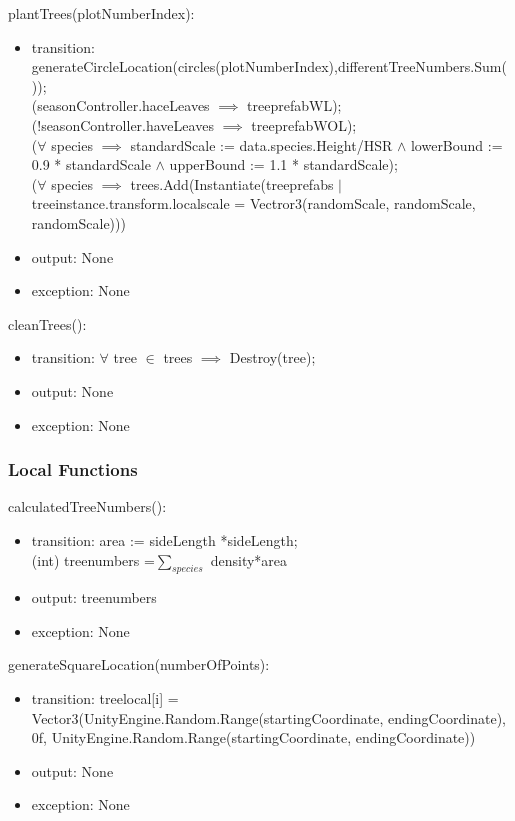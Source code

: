 \documentclass[12pt, titlepage]{article}
\begin{document}
\noindent plantTrees(plotNumberIndex):
\begin{itemize}
\item transition: generateCircleLocation(circles(plotNumberIndex),differentTreeNumbers.Sum());\\
(seasonController.haceLeaves $\implies$ treeprefabWL);\\
(!seasonController.haveLeaves $\implies$ treeprefabWOL);\\
($\forall$ species $\implies$ standardScale := data.species.Height/HSR $\land$ lowerBound := 0.9 * standardScale $\land$ upperBound := 1.1 * standardScale);\\
($\forall$ species $\implies$ trees.Add(Instantiate(treeprefabs $|$ treeinstance.transform.localscale = Vectror3(randomScale, randomScale, randomScale)))\\

\item output: None
\item exception: None
\end{itemize}

\noindent cleanTrees():
\begin{itemize}
\item transition: $\forall$ tree $\in$ trees $\implies$ Destroy(tree);
\item output: None
\item exception: None
\end{itemize}



\subsubsection{Local Functions}
\noindent calculatedTreeNumbers():
\begin{itemize}
\item transition: area := sideLength *sideLength;\\
(int) treenumbers =$\sum_{species}$ density*area

\item output: treenumbers
\item exception: None
\end{itemize}

\noindent generateSquareLocation(numberOfPoints):
\begin{itemize}
\item transition: 
treelocal[i] = Vector3(UnityEngine.Random.Range(startingCoordinate, endingCoordinate), 0f, UnityEngine.Random.Range(startingCoordinate, endingCoordinate))
\item output: None
\item exception: None
\end{itemize}
\end{document}
